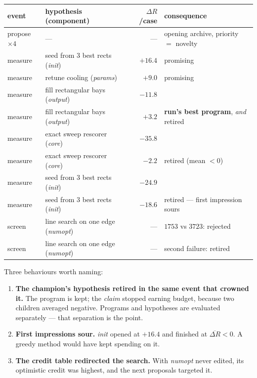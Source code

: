\documentclass[11pt]{article}
\begin{document}
\begin{center}
\begin{tabular}{llrl}
\toprule
event & hypothesis (component) & $\Delta R$/case & consequence \\
\midrule
propose $\times 4$ & --- & --- & opening archive, priority $=$ novelty \\
measure & seed from 3 best rects (\emph{init}) & $+16.4$ & promising \\
measure & retune cooling (\emph{params}) & $+9.0$ & promising \\
measure & fill rectangular bays (\emph{output}) & $-11.8$ & \\
measure & fill rectangular bays (\emph{output}) & $+3.2$ &
  \textbf{run's best program}, \emph{and} retired \\
measure & exact sweep rescorer (\emph{core}) & $-35.8$ & \\
measure & exact sweep rescorer (\emph{core}) & $-2.2$ & retired (mean $<0$) \\
measure & seed from 3 best rects (\emph{init}) & $-24.9$ & \\
measure & seed from 3 best rects (\emph{init}) & $-18.6$ & retired --- first impression sours \\
screen  & line search on one edge (\emph{numopt}) & --- & $1753$ vs $3723$: rejected \\
screen  & line search on one edge (\emph{numopt}) & --- & second failure: retired \\
\bottomrule
\end{tabular}
\end{center}

\noindent Three behaviours worth naming:
\begin{enumerate}\itemsep2pt
  \item \textbf{The champion's hypothesis retired in the same event that crowned it.} The program
    is kept; the \emph{claim} stopped earning budget, because two children averaged negative.
    Programs and hypotheses are evaluated separately --- that separation is the point.
  \item \textbf{First impressions sour.} \emph{init} opened at $+16.4$ and finished at
    $\overline{\Delta R} < 0$. A greedy method would have kept spending on it.
  \item \textbf{The credit table redirected the search.} With \emph{numopt} never edited, its
    optimistic credit was highest, and the next proposals targeted it.
\end{enumerate}
\end{document}
